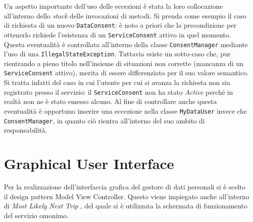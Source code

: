 Un aspetto importante dell’uso delle eccezioni \`e stata la loro collocazione all’interno dello \textit{stack} delle invocazioni di metodi. Si prenda come esempio il caso di richiesta di un nuovo \texttt{DataConsent}: \`e noto a priori che la precondizione per ottenerlo richiede l’esistenza di un \texttt{ServiceConsent} attivo in quel momento. Questa eventualit\`a \`e controllata all’interno della classe \texttt{ConsentManager} mediante l’uso di una \texttt{IllegalStateException}. Tuttavia esiste un sotto-caso che, pur rientrando a pieno titolo nell’insieme di situazioni non corrette (mancanza di un \texttt{ServiceConsent} attivo), merita di essere differenziato per il suo valore semantico. Si tratta infatti del caso in cui l’utente per cui si avanza la richiesta non sia registrato presso il servizio: il \texttt{ServiceConsent} non ha stato \textit{Active} perch\'e in realt\`a non ne \`e stato emesso alcuno. Al fine di controllare anche questa eventualit\`a \`e opportuno inserire una eccezione nella classe \texttt{MyDataUser} invece che \texttt{ConsentManager}, in quanto ci\`o rientra all’interno del suo ambito di responsabilit\`a.

\section{Graphical User Interface}
Per la realizzazione dell’interfaccia grafica del gestore di dati personali si \`e scelto il design pattern Model View Controller. Questo viene impiegato anche all’interno di \textit{Most Likely Next Trip} \cite{MLNT}, del quale si \`e utilizzata la schermata di funzionamento del servizio omonimo.

